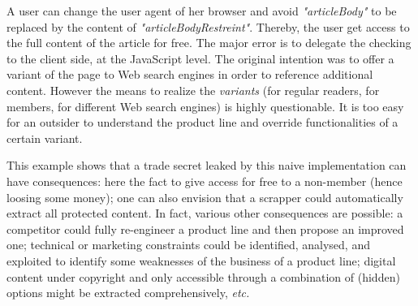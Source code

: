 \documentclass{sig-alternate}
\newcommand\ma[1]{\todo[color=green!40,inline]{TODO (Mathieu): #1}}
\newcommand\ma[1]{}
\newcommand{\etc}{\emph{etc.}\xspace}
\begin{document}
A user can change the user agent of her browser and avoid \emph{"articleBody"} to be replaced by the content of \emph{"articleBodyRestreint"}. Thereby, the user get access to the full content of the article for free.
The major error is to delegate the checking to the client side, at the JavaScript level. The original intention was to offer a variant of the page to Web search engines in order to reference additional content. However the means to realize the \emph{variants} (for regular readers, for members, for different Web search engines) is highly questionable. It is too easy for an outsider to understand the product line and override functionalities of a certain variant.

This example shows that a trade secret leaked by this naive implementation can have consequences: here the fact to give access for free to a non-member (hence loosing some money); one can also envision that a scrapper could automatically extract all protected content. 
 In fact, various other consequences are possible: a competitor could fully re-engineer a product line and then propose an improved one; technical or marketing constraints could be identified, analysed, and exploited to identify some weaknesses of the business of a product line; digital content under copyright and only accessible through a combination of (hidden) options might be extracted comprehensively, \etc
 
\end{document}
